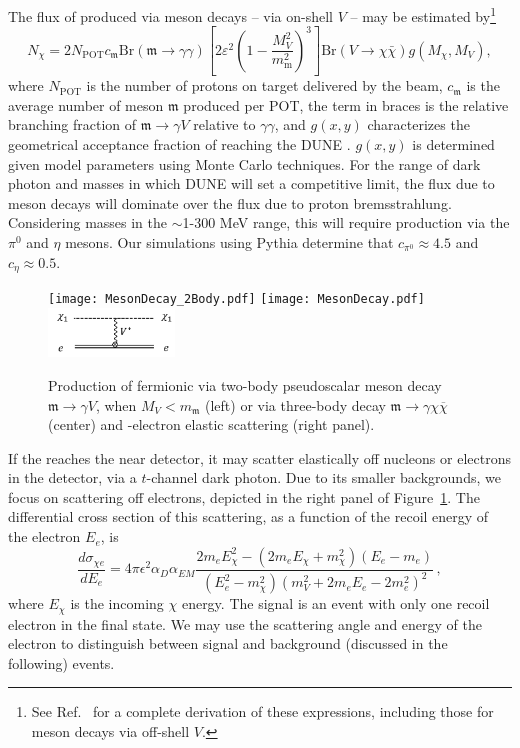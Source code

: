 The flux of  produced via meson decays -- via on-shell $V$ -- may be estimated by\footnote{See Ref.~\cite{DeRomeri:2019kic} for a complete derivation of these expressions, including those for meson decays via off-shell $V$.}
\begin{equation}
    N_\chi = 2 N_\mathrm{POT} c_\mathfrak{m} \mathrm{Br}(\mathfrak{m}\to \gamma\gamma) \left[ 2 \varepsilon^2 \left(1 - \frac{M_{V}^2}{m_\mathrm{m}^2}\right)^3\right] \mathrm{Br}(V \to \chi\bar{\chi}) g(M_\chi, M_{V}),
\end{equation}
where $N_\mathrm{POT}$ is the number of protons on target delivered by the beam, $c_\mathfrak{m}$ is the average number of meson $\mathfrak{m}$ produced per POT, the term in braces is the relative branching fraction of $\mathfrak{m} \to \gamma V$ relative to $\gamma\gamma$, and $g(x, y)$ characterizes the geometrical acceptance fraction of  reaching the DUNE . $g(x, y)$ is determined given model parameters using Monte Carlo techniques. For the range of dark photon and  masses in which DUNE will set a competitive limit, the  flux due to meson decays will dominate over the flux due to proton bremsstrahlung. Considering  masses in the $\sim$1-300 MeV range, this will require production via the $\pi^0$ and $\eta$ mesons. Our simulations using {\sc Pythia} determine that $c_{\pi^0} \approx 4.5$ and $c_\eta \approx 0.5$.

\begin{figure}[t]
\centering
 \texttt{[image: MesonDecay\_2Body.pdf]}
    \texttt{[image: MesonDecay.pdf]}
\includegraphics[width=0.30\textwidth]{graphics/DM_detect.png}
\caption[DM production via meson decays and DM-e$^-$ elastic scattering]{ 
Production of fermionic  via two-body pseudoscalar meson decay $\mathfrak{m} \to \gamma V$, when $M_{V} < m_\mathfrak{m}$ (left) or via three-body decay $\mathfrak{m} \to \gamma \chi \overline{\chi}$ (center) and -electron elastic scattering (right panel).}
\label{fig:dm_prod}
\end{figure}

If the  reaches the near detector, it may scatter elastically off nucleons or electrons in the detector, via a $t$-channel dark photon. Due to its smaller backgrounds, we focus on scattering off electrons, depicted in the right panel of Figure~\ref{fig:dm_prod}. The differential cross section of this scattering, as a function of the recoil energy of the electron $E_e$, is
\begin{equation}
\frac{d\sigma_{{\chi}e}}{dE_{e}} 
= 4\pi \epsilon^{2}\alpha_D\alpha_{EM} \frac{2m_{e}E_{\chi}^{2} - (2m_{e}E_{\chi} + m_{\chi}^{2})(E_e-m_{e})}{(E_e^{2}-m_{\chi}^{2})(m_{V}^{2}+2m_{e}E_{e}-2m_{e}^{2})^{2}}\,,
\end{equation}
where $E_{\chi}$ is the incoming  $\chi$ energy. The signal is an event with only one recoil electron in the final state. We may use the scattering angle and energy of the electron to distinguish between signal and background (discussed in the following) events.

